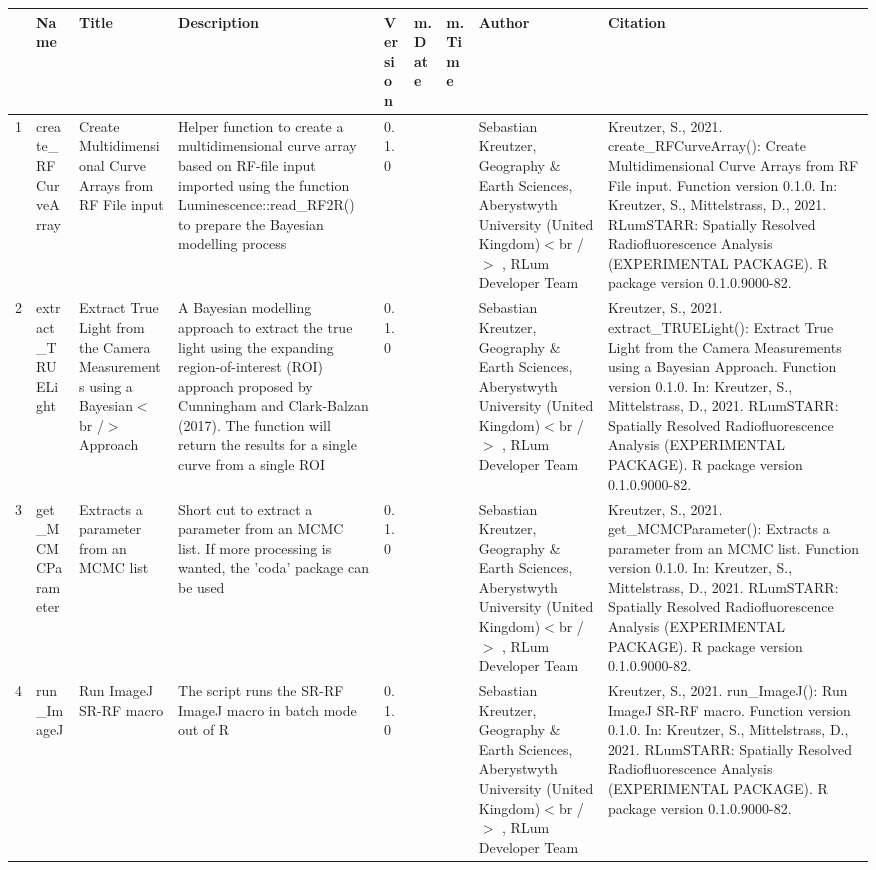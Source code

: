 \begin{table}[ht]
\centering
\begin{tabular}{rllllllll}
  \hline
 & Name & Title & Description & Version & m.Date & m.Time & Author & Citation \\ 
  \hline
1 & create\_RFCurveArray & Create Multidimensional Curve Arrays from RF File input & Helper function to create a multidimensional curve array based on RF-file input imported using the function  Luminescence::read\_RF2R()  to prepare the Bayesian modelling process & 0.1.0
 &  &  & Sebastian Kreutzer, Geography \& Earth Sciences, Aberystwyth University (United Kingdom)$<$br /$>$ , RLum Developer Team & Kreutzer, S., 2021. create\_RFCurveArray(): Create Multidimensional Curve Arrays from RF File input. Function version 0.1.0. In: Kreutzer, S., Mittelstrass, D., 2021. RLumSTARR: Spatially Resolved Radiofluorescence Analysis (EXPERIMENTAL PACKAGE). R package version 0.1.0.9000-82. 
 \\ 
  2 & extract\_TRUELight & Extract True Light from the Camera Measurements using a Bayesian$<$br /$>$ Approach & A Bayesian modelling approach to extract the true light using the expanding region-of-interest (ROI) approach proposed by Cunningham and Clark-Balzan (2017). The function will return the results for a  single  curve from a  single  ROI & 0.1.0
 &  &  & Sebastian Kreutzer, Geography \& Earth Sciences, Aberystwyth University (United Kingdom)$<$br /$>$ , RLum Developer Team & Kreutzer, S., 2021. extract\_TRUELight(): Extract True Light from the Camera Measurements using a Bayesian Approach. Function version 0.1.0. In: Kreutzer, S., Mittelstrass, D., 2021. RLumSTARR: Spatially Resolved Radiofluorescence Analysis (EXPERIMENTAL PACKAGE). R package version 0.1.0.9000-82. 
 \\ 
  3 & get\_MCMCParameter & Extracts a parameter from an MCMC list & Short cut to extract a parameter from an MCMC list. If more processing is wanted, the  'coda'  package can be used & 0.1.0
 &  &  & Sebastian Kreutzer, Geography \& Earth Sciences, Aberystwyth University (United Kingdom)$<$br /$>$ , RLum Developer Team & Kreutzer, S., 2021. get\_MCMCParameter(): Extracts a parameter from an MCMC list. Function version 0.1.0. In: Kreutzer, S., Mittelstrass, D., 2021. RLumSTARR: Spatially Resolved Radiofluorescence Analysis (EXPERIMENTAL PACKAGE). R package version 0.1.0.9000-82. 
 \\ 
  4 & run\_ImageJ & Run ImageJ SR-RF macro & The script runs the SR-RF ImageJ macro in batch mode out of R & 0.1.0
 &  &  & Sebastian Kreutzer, Geography \& Earth Sciences, Aberystwyth University (United Kingdom)$<$br /$>$ , RLum Developer Team & Kreutzer, S., 2021. run\_ImageJ(): Run ImageJ SR-RF macro. Function version 0.1.0. In: Kreutzer, S., Mittelstrass, D., 2021. RLumSTARR: Spatially Resolved Radiofluorescence Analysis (EXPERIMENTAL PACKAGE). R package version 0.1.0.9000-82. 

\end{tabular}
\end{table}
